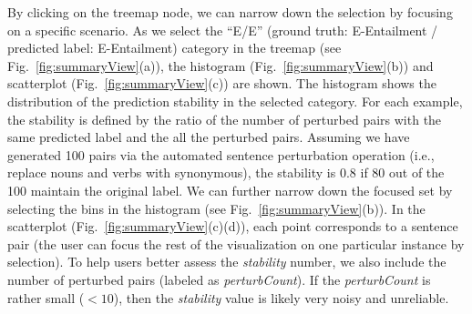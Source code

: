 By clicking on the treemap node, we can narrow down the selection by focusing on a specific scenario.
As we select the ``E/E'' (ground truth: E-Entailment / predicted label: E-Entailment) category in the treemap (see Fig.~\ref{fig:summaryView}(a)), the histogram (Fig.~\ref{fig:summaryView}(b)) and scatterplot  (Fig.~\ref{fig:summaryView}(c)) are shown. The histogram shows the distribution of the prediction stability in the selected category. For each example, the stability is defined by the ratio of the number of perturbed pairs with the same predicted label and the all the perturbed pairs. Assuming we have generated 100 pairs via the automated sentence perturbation operation (i.e., replace nouns and verbs with synonymous), the stability is 0.8 if 80 out of the 100 maintain the original label. 
%
We can further narrow down the focused set by selecting the bins in the histogram (see Fig.~\ref{fig:summaryView}(b)).
%
In the scatterplot (Fig.~\ref{fig:summaryView}(c)(d)), each point corresponds to a sentence pair (the user can focus the rest of the visualization on one particular instance by selection). To help users better assess the \emph{stability} number, we also include the number of perturbed pairs (labeled as \emph{perturbCount}). If the \emph{perturbCount} is rather small ($<10$), then the \emph{stability} value is likely very noisy and unreliable. %



